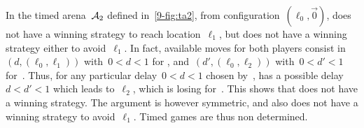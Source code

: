 \begin{example}
  In the timed arena~$\mathcal{A}_2$ defined in~\cref{9-fig:ta2}, from configuration~$(\ell_0,\vec{0})$, \Eve does not have a winning strategy to reach location~$\ell_1$, but \Adam does not have a winning strategy either to avoid~$\ell_1$.
  In fact, available moves for both players consist in~$(d,(\ell_0,\ell_1))$ with~$0< d<1$ for \Eve, and~$(d',(\ell_0,\ell_2))$ with~$0< d' < 1$ for~\Adam.
  Thus, for any particular delay~$0<d<1$ chosen by~\Eve, \Adam has a possible delay $d<d'<1$ which leads to~$\ell_2$, which is losing for~\Eve.
  This shows that \Eve does not have a winning strategy.
  The argument is however symmetric, and \Adam also does not have a winning strategy to avoid~$\ell_1$.
  Timed games are thus non determined.
\end{example}













